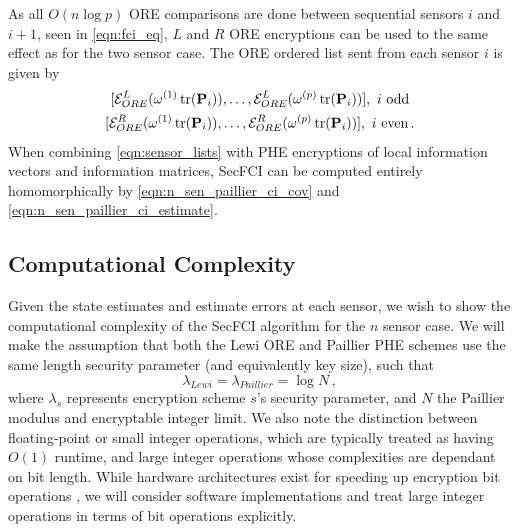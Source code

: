 \documentclass[letterpaper, 10 pt, conference]{ieeeconf}  %
\begin{document}
As all $O(n\log{p})$ ORE comparisons are done between sequential sensors $i$ and $i+1$, seen in \eqref{eqn:fci_eq}, $L$ and $R$ ORE encryptions can be used to the same effect as for the two sensor case. The ORE ordered list sent from each sensor $i$ is given by
\begin{equation}
   \begin{gathered} \label{eqn:sensor_lists}
      [\mathcal{E}^L_{ORE}(\omega^{(1)}\tr(\mP_i)),\dots,\mathcal{E}^L_{ORE}(\omega^{(p)}\tr(\mP_i))],\ i\text{ odd} \\
      [\mathcal{E}^R_{ORE}(\omega^{(1)}\tr(\mP_i)),\dots,\mathcal{E}^R_{ORE}(\omega^{(p)}\tr(\mP_i))],\ i\text{ even}\,.
   \end{gathered}
\end{equation}
When combining \eqref{eqn:sensor_lists} with PHE encryptions of local information vectors and information matrices, SecFCI can be computed entirely homomorphically by \eqref{eqn:n_sen_paillier_ci_cov} and \eqref{eqn:n_sen_paillier_ci_estimate}.


\subsection{Computational Complexity} \label{subsec:complexity}
Given the state estimates and estimate errors at each sensor, we wish to show the computational complexity of the SecFCI algorithm for the $n$ sensor case. We will make the assumption that both the Lewi ORE and Paillier PHE schemes use the same length security parameter (and equivalently key size), such that
\begin{equation}
   \lambda_{Lewi} = \lambda_{Paillier} = \log{N}\,, \label{eqn:keylength}
\end{equation}
where $\lambda_{s}$ represents encryption scheme $s$'s security parameter, and $N$ the Paillier modulus and encryptable integer limit. We also note the distinction between floating-point or small integer operations, which are typically treated as having $O(1)$ runtime, and large integer operations whose complexities are dependant on bit length. While hardware architectures exist for speeding up encryption bit operations \cite{gueronIntelAdvancedEncryption2010}, we will consider software implementations and treat large integer operations in terms of bit operations explicitly.
\end{document}
